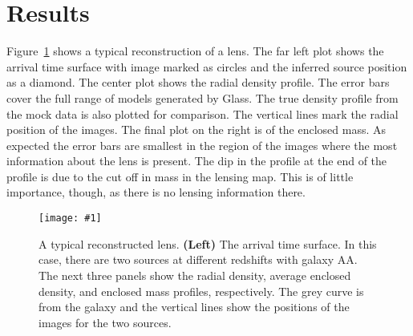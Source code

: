 \documentclass[onecolumn,galley]{mn2e}
\newcommand{\Glass}{{\sc Glass}}
\newcommand{\figref}[1] {Figure~\ref{#1}}
\newcommand\plotone[1]{%
 \centering
 \leavevmode
 \texttt{[image: \#1]}%
}%
\begin{document}
%

\section{Results} %

\figref{AAZContrastR1R5_Tm reconstruction} shows a typical reconstruction of a
lens. The far left plot shows the arrival time surface with image marked as
circles and the inferred source position as a diamond. The center plot shows
the radial density profile. The error bars cover the full range of models
generated by \Glass. The true density profile from the mock data is also
plotted for comparison. The vertical lines mark the radial position of the
images. The final plot on the right is of the enclosed mass. As expected the
error bars are smallest in the region of the images where the most information
about the lens is present. The dip in the profile at the end of the profile
is due to the cut off in mass in the lensing map. This is of little importance,
though, as there is no lensing information there.

\begin{figure}
\plotone{AAZContrastR1R5_Tm.pdf}
\caption{A typical reconstructed lens. 
\textbf{(Left)}
The arrival time surface. In this case, there are two sources at different
redshifts with galaxy AA. The next three panels show the radial density,
average enclosed density, and enclosed mass profiles, respectively.  The grey
curve is from the galaxy and the vertical lines show the positions of the
images for the two sources.}
\label{AAZContrastR1R5_Tm reconstruction}
\end{figure}
\end{document}
